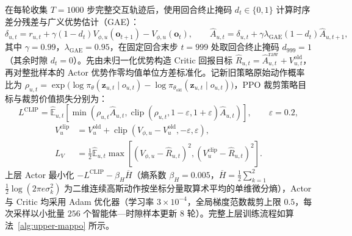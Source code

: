 在每轮收集 $T=1000$ 步完整交互轨迹后，使用回合终止掩码 $d_t\in\{0,1\}$ 计算时序差分残差与广义优势估计（GAE）：
\begin{equation}
 \delta_{u,t}=r_{u,t}+\gamma(1-d_t)V_{\phi,u}(\mathbf o_{t+1})
                       -V_{\phi,u}(\mathbf o_t),\qquad
 \widehat A_{u,t}=\delta_{u,t}+\gamma\lambda_{\mathrm{GAE}}(1-d_t)
                                  \widehat A_{u,t+1},
 \label{eq:gae}
\end{equation}
其中 $\gamma=0.99$，$\lambda_{\mathrm{GAE}}=0.95$，在固定回合末步 $t=999$ 处取回合终止掩码 $d_{999}=1$（其余时隙 $d_t=0$）。先由未归一化优势构造 Critic 回报目标 $\widehat{R}_{u,t}=\widehat{A}_{u,t}^{\mathrm{raw}}+V_{u,t}^{\mathrm{old}}$，再对整批样本的 Actor 优势作零均值单位方差标准化。记新旧策略原始动作概率比为 $\rho_{u,t}=\exp\big(\log\pi_\theta(\mathbf{z}_{u,t}\mid o_{u,t})-\log\pi_{\theta_{\mathrm{old}}}(\mathbf{z}_{u,t}\mid o_{u,t})\big)$，PPO 裁剪策略目标与裁剪价值损失分别为：
\begin{equation}
 L^{\mathrm{CLIP}}=\widehat{\mathbb E}_{u,t}
 \left[\min\left(\rho_{u,t}\widehat A_{u,t},
 \operatorname{clip}(\rho_{u,t},1-\varepsilon,1+\varepsilon)
 \widehat A_{u,t}\right)\right],\qquad\varepsilon=0.2,
 \label{eq:ppo-clip}
\end{equation}
\begin{equation}
 \begin{aligned}
 V_u^{\mathrm{clip}}&=V_u^{\mathrm{old}}+
 \operatorname{clip}(V_{\phi,u}-V_u^{\mathrm{old}},-\varepsilon,\varepsilon),\\
 L_V&=\frac12\widehat{\mathbb E}_{u,t}
 \max\left[(V_{\phi,u}-\widehat R_{u,t})^2,
           (V_u^{\mathrm{clip}}-\widehat R_{u,t})^2\right].
 \end{aligned}
 \label{eq:ch3-value-clipping}
\end{equation}
上层 Actor 最小化 $-L^{\mathrm{CLIP}}-\allowbreak\beta_H\overline{H}$（熵系数 $\beta_H=\allowbreak 0.005$，$\overline{H}=\allowbreak\frac{1}{2}\allowbreak\sum_{k=1}^{2}$\allowbreak$\frac{1}{2}\allowbreak\log(\allowbreak 2\pi e\allowbreak\sigma_k^2)$ 为二维连续高斯动作按坐标分量取算术平均的单维微分熵），Actor 与 Critic 均采用 Adam 优化器（学习率 $3\times 10^{-4}$，全局梯度范数裁剪上限 $0.5$，每次采样以小批量 $256$ 个智能体—时隙样本更新 $8$ 轮）。完整上层训练流程如算法~\ref{alg:upper-mappo} 所示。

